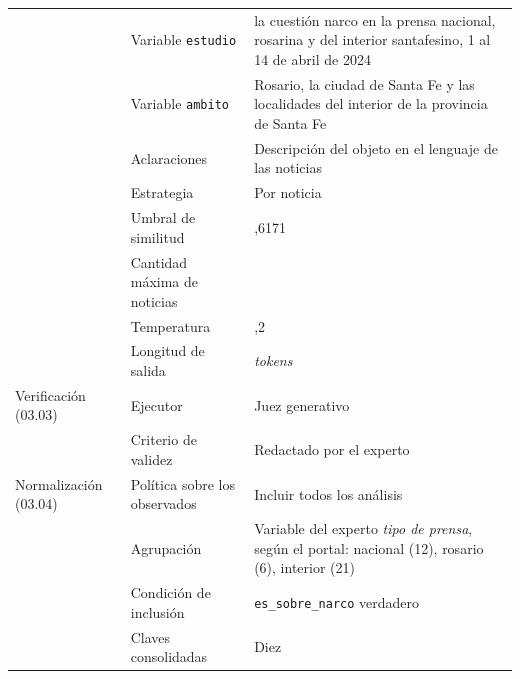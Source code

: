 \documentclass[12pt]{report}
\begin{document}
\begin{table}[H]
\begin{tabularx}{\textwidth}{@{}>{\raggedright\arraybackslash}p{2.9cm} >{\raggedright\arraybackslash}p{3.6cm} >{\raggedright\arraybackslash}X@{}}
                               & Variable \texttt{estudio}     & la cuestión narco en la prensa nacional, rosarina y del interior santafesino, 1 al 14 de abril de 2024   \\
                               & Variable \texttt{ambito}      & Rosario, la ciudad de Santa Fe y las localidades del interior de la provincia de Santa Fe                \\
                               & Aclaraciones                  & Descripción del objeto en el lenguaje de las noticias                                                    \\
                               & Estrategia                    & Por noticia                                                                                              \\
                               & Umbral de similitud           & 0,6171                                                                                                   \\
                               & Cantidad máxima de noticias   & 450                                                                                                      \\
                               & Temperatura                   & 0,2                                                                                                      \\
                               & Longitud de salida            & 1.024 \textit{tokens}                                                                                    \\
    \addlinespace
    Verificación (03.03)       & Ejecutor                      & Juez generativo                                                                                          \\
                               & Criterio de validez           & Redactado por el experto                                                                                 \\
    \addlinespace
    Normalización (03.04)      & Política sobre los observados & Incluir todos los análisis                                                                               \\
                               & Agrupación                    & Variable del experto \textit{tipo de prensa}, según el portal: nacional (12), rosario (6), interior (21) \\
                               & Condición de inclusión        & \texttt{es\_sobre\_narco} verdadero                                                                      \\
                               & Claves consolidadas           & Diez                                                                                                     \\
    \bottomrule
  \end{tabularx}
\end{table}
\end{document}
